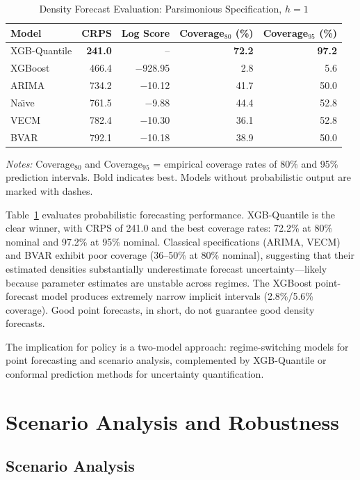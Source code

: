 \documentclass[12pt,a4paper]{article}
\begin{document}
\begin{table}[htbp]
\centering
\caption{Density Forecast Evaluation: Parsimonious Specification, $h = 1$}
\label{tab:density}
\begin{tabular}{lrrrr}
\toprule
Model & CRPS & Log Score & Coverage$_{80}$ (\%) & Coverage$_{95}$ (\%) \\
\midrule
XGB-Quantile & \textbf{241.0} & -- & \textbf{72.2} & \textbf{97.2} \\
XGBoost & 466.4 & $-$928.95 & 2.8 & 5.6 \\
ARIMA & 734.2 & $-$10.12 & 41.7 & 50.0 \\
Na\"{\i}ve & 761.5 & $-$9.88 & 44.4 & 52.8 \\
VECM & 782.4 & $-$10.30 & 36.1 & 52.8 \\
BVAR & 792.1 & $-$10.18 & 38.9 & 50.0 \\
\bottomrule
\end{tabular}
\begin{tablenotes}
\small
\item \textit{Notes:} Coverage$_{80}$ and Coverage$_{95}$ = empirical coverage rates of 80\% and 95\% prediction intervals. Bold indicates best. Models without probabilistic output are marked with dashes.
\end{tablenotes}
\end{table}

Table~\ref{tab:density} evaluates probabilistic forecasting performance. XGB-Quantile is the clear winner, with CRPS of 241.0 and the best coverage rates: 72.2\% at 80\% nominal and 97.2\% at 95\% nominal. Classical specifications (ARIMA, VECM) and BVAR exhibit poor coverage (36--50\% at 80\% nominal), suggesting that their estimated densities substantially underestimate forecast uncertainty---likely because parameter estimates are unstable across regimes. The XGBoost point-forecast model produces extremely narrow implicit intervals (2.8\%/5.6\% coverage). Good point forecasts, in short, do not guarantee good density forecasts.

The implication for policy is a two-model approach: regime-switching models for point forecasting and scenario analysis, complemented by XGB-Quantile or conformal prediction methods for uncertainty quantification.

\section{Scenario Analysis and Robustness}

\subsection{Scenario Analysis}
\end{document}
